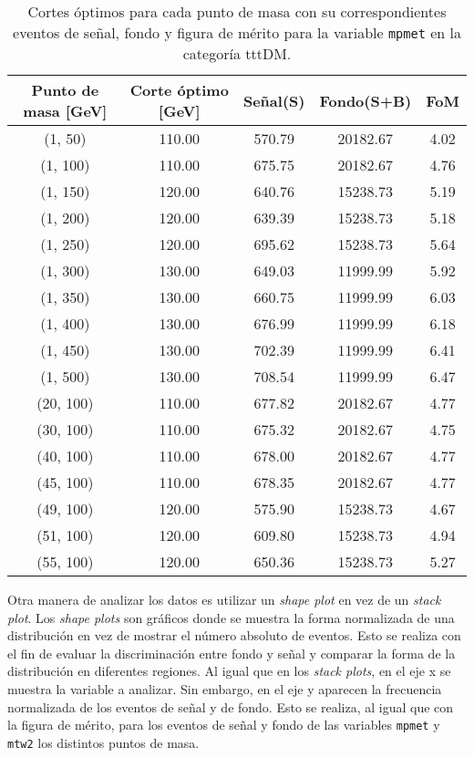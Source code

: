 \begin{table}[h!]
\centering
\begin{tabular}{ |c| |c| |c| |c| |c| }
 \hline
Punto de masa [GeV] & Corte óptimo [GeV] & Señal(S) & Fondo(S+B) & FoM \\
 \hline
(1, 50) & 110.00 & 570.79 & 20182.67 & 4.02 \\
 \hline
(1, 100) & 110.00 & 675.75 & 20182.67 & 4.76 \\
 \hline
(1, 150) & 120.00 & 640.76 & 15238.73 & 5.19 \\
 \hline
(1, 200) & 120.00 & 639.39 & 15238.73 & 5.18 \\
 \hline
(1, 250) & 120.00 & 695.62 & 15238.73 & 5.64 \\
 \hline
(1, 300) & 130.00 & 649.03 & 11999.99 & 5.92 \\
 \hline
(1, 350) & 130.00 & 660.75 & 11999.99 & 6.03 \\
 \hline
(1, 400) & 130.00 & 676.99 & 11999.99 & 6.18 \\
 \hline
(1, 450) & 130.00 & 702.39 & 11999.99 & 6.41 \\
 \hline
(1, 500) & 130.00 & 708.54 & 11999.99 & 6.47 \\
 \hline
(20, 100) & 110.00 & 677.82 & 20182.67 & 4.77 \\
 \hline
(30, 100) & 110.00 & 675.32 & 20182.67 & 4.75 \\
 \hline
(40, 100) & 110.00 & 678.00 & 20182.67 & 4.77 \\
 \hline
(45, 100) & 110.00 & 678.35 & 20182.67 & 4.77 \\
 \hline
(49, 100) & 120.00 & 575.90 & 15238.73 & 4.67 \\
 \hline
(51, 100) & 120.00 & 609.80 & 15238.73 & 4.94 \\
 \hline
(55, 100) & 120.00 & 650.36 & 15238.73 & 5.27 \\
 \hline

\end{tabular}
\caption{Cortes óptimos para cada punto de masa con su correspondientes eventos de señal, fondo y figura de mérito para la variable \texttt{mpmet} en la categoría tttDM.}
\label{tab:auto}
\end{table}

Otra manera de analizar los datos es utilizar un \textit{shape plot} en vez de un \textit{stack plot}. Los \textit{shape plots} son gráficos donde se muestra la forma normalizada de una distribución en vez de mostrar el número absoluto de eventos. Esto se realiza con el fin de evaluar la discriminación entre fondo y señal y comparar la forma de la distribución en diferentes regiones. Al igual que en los \textit{stack plots}, en el eje x se muestra la variable a analizar. Sin embargo, en el eje y aparecen la frecuencia normalizada de los eventos de señal y de fondo. Esto se realiza, al igual que con la figura de mérito, para los eventos de señal y fondo de las variables \texttt{mpmet} y \texttt{mtw2} los distintos puntos de masa.\\


